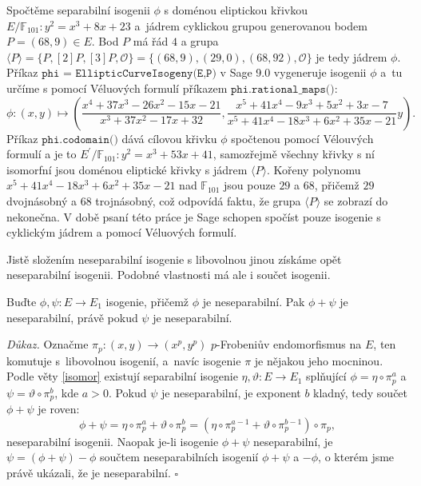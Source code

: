 \documentclass[12pt]{report}
\begin{document}
\begin{priklad}
Spočtěme separabilní isogenii $\phi$ s doménou eliptickou křivkou $E/\mathbb{F}_{101} : y^2 = x^3+8x+23$ a~jádrem cyklickou grupou generovanou bodem $P =(68,9) \in E$. Bod $P$ má řád $4$ a grupa $\langle P \rangle = \lbrace P,[2]P,[3]P,\mathcal{O}\rbrace = \lbrace (68,9),(29,0), (68,92),\mathcal{O} \rbrace$ je tedy jádrem $\phi$. Příkaz $\texttt{phi = EllipticCurveIsogeny(E,P)}$ v Sage 9.0 vygeneruje isogenii $\phi$ a~tu určíme s pomocí Véluových formulí příkazem $\texttt{phi.rational\_maps()}$:
\begin{equation*}
\phi : (x,y) \longmapsto \left(\frac{x^4 + 37 x^3 - 26 x^2 - 15x - 21}{x^3 + 37 x^2 - 17 x + 32},\frac{x^5 + 41 x^4 - 9 x^3 + 5 x^2 + 3x - 7}{x^5 + 41 x^4 - 18 x^3 + 6 x^2 + 35x - 21} y  \right). 
\end{equation*}
Příkaz $\texttt{phi.codomain()}$ dává cílovou křivku $\phi$ spočtenou pomocí Vélouvých formulí a je to $E^\prime/\mathbb{F}_{101} : y^2 = x^3 + 53 x + 41$, samozřejmě všechny křivky s ní isomorfní jsou doménou eliptické křivky s jádrem $\langle P \rangle$. Kořeny polynomu $x^5 + 41 x^4 - 18 x^3 + 6 x^2 + 35x - 21$ nad $\mathbb{F}_{101}$ jsou pouze $29$ a $68$, přičemž $29$ dvojnásobný a $68$ trojnásobný, což odpovídá faktu, že grupa $\langle P \rangle$ se zobrazí do nekonečna. V době psaní této práce je Sage schopen spočíst pouze isogenie s cyklickým jádrem a pomocí Véluových formulí.
\end{priklad}

Jistě složením neseparabilní isogenie s libovolnou jinou získáme opět neseparabilní isogenii. Podobné vlastnosti má ale i součet isogenii.
\begin{veta}\label{separsum}
Buďte $\phi,\psi : E \longrightarrow E_1$ isogenie, přičemž $\phi$ je neseparabilní. Pak $\phi+\psi$ je neseparabilní, právě pokud $\psi$ je neseparabilní.
\end{veta}
\noindent \textit{Důkaz.} Označme $\pi_p : (x,y) \rightarrow (x^p,y^p)$ $p$-Frobeniův endomorfismus na $E$, ten komutuje s~libovolnou isogenií, a~navíc isogenie $\pi$ je nějakou jeho mocninou. Podle věty \ref{isomor} existují separabilní isogenie $\eta,\vartheta : E \longrightarrow E_1$ splňující $\phi =  \eta \circ \pi_p ^a$ a $\psi = \vartheta\circ \pi_p ^b$, kde $a > 0$. Pokud $\psi$ je neseparabilní, je exponent $b$ kladný, tedy součet $\phi+\psi$ je roven:
\begin{equation*}
\phi+\psi = \eta \circ \pi_p ^a +\vartheta\circ \pi_p ^b = (\eta \circ \pi_p ^{a-1} + \vartheta \circ \pi_p ^{b-1}) \circ \pi_p, 
\end{equation*}
neseparabilní isogenii. Naopak je-li isogenie $\phi+\psi$ neseparabilní, je $\psi = (\phi+\psi) - \phi$ součtem neseparabilních isogenií $\phi+\psi$ a $-\phi$, o kterém jsme právě ukázali, že je neseparabilní. \hfill $\square$\\
\end{document}
